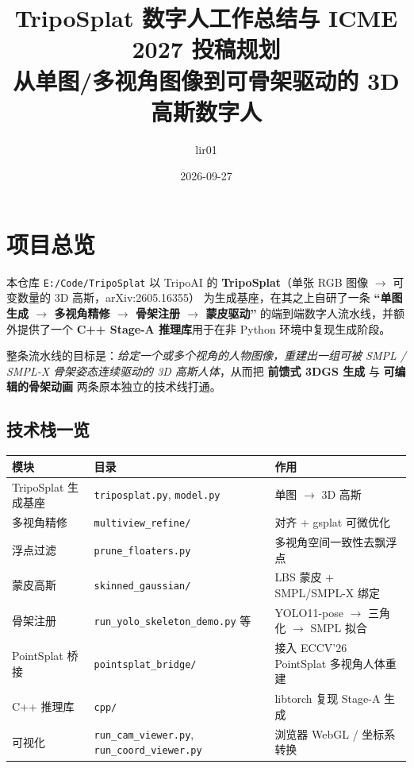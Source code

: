 \documentclass[11pt]{article}
\title{\textbf{TripoSplat 数字人工作总结与 ICME 2027 投稿规划}\\\large 从单图/多视角图像到可骨架驱动的 3D 高斯数字人}
\author{lir01}
\date{2026-09-27}
\begin{document}
\maketitle

\section{项目总览}

本仓库 \texttt{E:/Code/TripoSplat} 以 TripoAI 的
\textbf{TripoSplat}（单张 RGB 图像 $\rightarrow$ 可变数量的 3D 高斯，arXiv:2605.16355）
为生成基座，在其之上自研了一条
\textbf{``单图生成 $\rightarrow$ 多视角精修 $\rightarrow$ 骨架注册 $\rightarrow$ 蒙皮驱动''}
的端到端数字人流水线，并额外提供了一个
\textbf{C++ Stage-A 推理库}用于在非 Python 环境中复现生成阶段。

整条流水线的目标是：\emph{给定一个或多个视角的人物图像，重建出一组可被
SMPL / SMPL-X 骨架姿态连续驱动的 3D 高斯人体}，从而把
\textbf{前馈式 3DGS 生成} 与 \textbf{可编辑的骨架动画} 两条原本独立的技术线打通。

\subsection{技术栈一览}

\begin{center}
\begin{tabular}{@{}lll@{}}
\toprule
\textbf{模块} & \textbf{目录} & \textbf{作用} \\
\midrule
TripoSplat 生成基座 & \texttt{triposplat.py}, \texttt{model.py} & 单图 $\rightarrow$ 3D 高斯 \\
多视角精修 & \texttt{multiview\_refine/} & 对齐 + gsplat 可微优化 \\
浮点过滤 & \texttt{prune\_floaters.py} & 多视角空间一致性去飘浮点 \\
蒙皮高斯 & \texttt{skinned\_gaussian/} & LBS 蒙皮 + SMPL/SMPL-X 绑定 \\
骨架注册 & \texttt{run\_yolo\_skeleton\_demo.py} 等 & YOLO11-pose $\rightarrow$ 三角化 $\rightarrow$ SMPL 拟合 \\
PointSplat 桥接 & \texttt{pointsplat\_bridge/} & 接入 ECCV'26 PointSplat 多视角人体重建 \\
C++ 推理库 & \texttt{cpp/} & libtorch 复现 Stage-A 生成 \\
可视化 & \texttt{run\_cam\_viewer.py}, \texttt{run\_coord\_viewer.py} & 浏览器 WebGL / 坐标系转换 \\
\bottomrule
\end{tabular}
\end{center}
\end{document}
